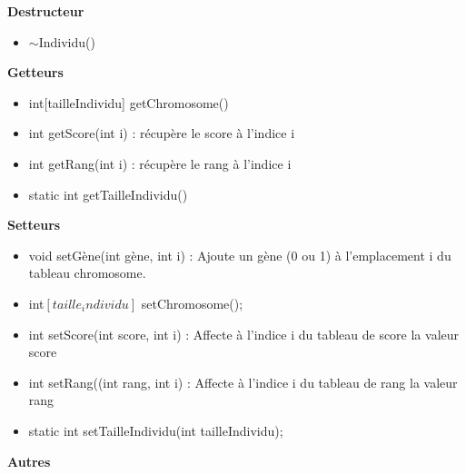 \documentclass[a4paper,11pt]{article}
\begin{document}
			\textbf{Destructeur}
					\begin{itemize}
							\item $\sim$Individu()\\
					\end{itemize}
			\textbf{Getteurs}
					\begin{itemize}
							\item int[tailleIndividu] getChromosome()
							\item int getScore(int i) : récupère le score à l’indice i
							\item int getRang(int i) : récupère le rang à l’indice i
							\item static int getTailleIndividu()\\
					\end{itemize}
			\textbf{Setteurs}
					\begin{itemize}
							\item void setGène(int gène, int i) : Ajoute un gène (0 ou 1) à l’emplacement i du tableau chromosome. 
							\item int$[taille_individu]$ setChromosome();
							\item int setScore(int score, int i) : Affecte à l’indice i du tableau de score la valeur score
							\item int setRang((int rang, int i) : Affecte à l’indice i du tableau de rang la valeur rang
							\item static int setTailleIndividu(int tailleIndividu);\\
					\end{itemize}
			\textbf{Autres}
\end{document}
